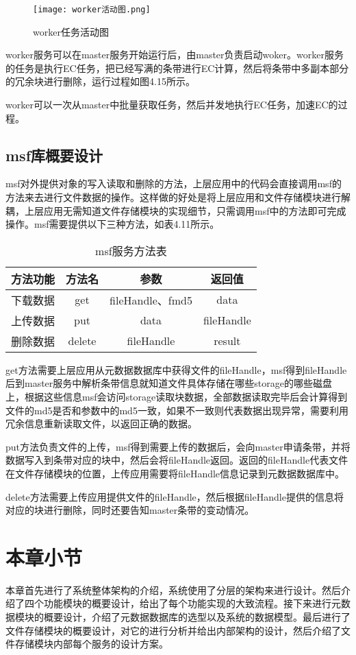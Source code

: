 \begin{figure}[h]
  \centering
  \texttt{[image: worker活动图.png]}
  \caption{worker任务活动图}
\end{figure}

worker服务可以在master服务开始运行后，由master负责启动woker。worker服务的任务是执行EC任务，把已经写满的条带进行EC计算，然后将条带中多副本部分的冗余块进行删除，运行过程如图4.15所示。

worker可以一次从master中批量获取任务，然后并发地执行EC任务，加速EC的过程。

\subsection{msf库概要设计}

msf对外提供对象的写入读取和删除的方法，上层应用中的代码会直接调用msf的方法来去进行文件数据的操作。这样做的好处是将上层应用和文件存储模块进行解耦，上层应用无需知道文件存储模块的实现细节，只需调用msf中的方法即可完成操作。msf需要提供以下三种方法，如表4.11所示。

\begin{table}[h]
  \centering
  \caption{msf服务方法表}
  \begin{tabular}{cccc}
    \toprule
    方法功能   & 方法名    & 参数     & 返回值               \\
    \midrule
    下载数据      & get    & fileHandle、fmd5  & data       \\
    \addlinespace
    上传数据      & put    & data              & fileHandle \\
    \addlinespace
    删除数据      & delete & fileHandle        & result     \\
    \bottomrule
  \end{tabular}
\end{table}	

get方法需要上层应用从元数据数据库中获得文件的fileHandle，msf得到fileHandle后到master服务中解析条带信息就知道文件具体存储在哪些storage的哪些磁盘上，根据这些信息msf会访问storage读取块数据，全部数据读取完毕后会计算得到文件的md5是否和参数中的md5一致，如果不一致则代表数据出现异常，需要利用冗余信息重新读取文件，以返回正确的数据。

put方法负责文件的上传，msf得到需要上传的数据后，会向master申请条带，并将数据写入到条带对应的块中，然后会将fileHandle返回。返回的fileHandle代表文件在文件存储模块的位置，上传应用需要将fileHandle信息记录到元数据数据库中。

delete方法需要上传应用提供文件的fileHandle，然后根据fileHandle提供的信息将对应的块进行删除，同时还要告知master条带的变动情况。

\section{本章小节}
本章首先进行了系统整体架构的介绍，系统使用了分层的架构来进行设计。然后介绍了四个功能模块的概要设计，给出了每个功能实现的大致流程。接下来进行元数据模块的概要设计，介绍了元数据数据库的选型以及系统的数据模型。最后进行了文件存储模块的概要设计，对它的进行分析并给出内部架构的设计，然后介绍了文件存储模块内部每个服务的设计方案。